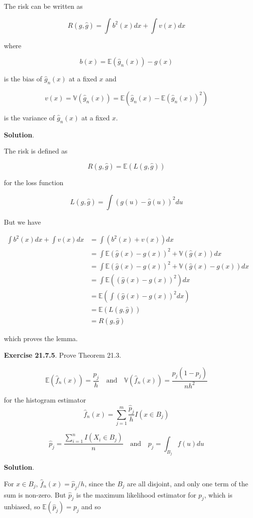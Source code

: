 The risk can be written as

\[ R(g, \hat{g}) = \int b^2(x) dx + \int v(x) dx \]

where

\[ b(x) = \mathbb{E}(\hat{g}_n(x)) - g(x) \]

is the bias of \(\hat{g}_n(x)\) at a fixed \(x\) and

\[ v(x) = \mathbb{V}(\hat{g}_n(x)) = \mathbb{E}\left( \hat{g}_n(x) - \mathbb{E}(\hat{g}_n(x))^2\right) \]

is the variance of \(\hat{g}_n(x)\) at a fixed \(x\).

\textbf{Solution}.

The risk is defined as

\[ R(g, \hat{g}) = \mathbb{E}\left(L(g, \hat{g}) \right) \]

for the loss function

\[ L(g, \hat{g}) = \int (g(u) - \hat{g}(u))^2 du\]

But we have

\[
\begin{align}
\int b^2(x) dx + \int v(x) dx &= \int (b^2(x) + v(x)) dx \\
&= \int \mathbb{E}(\hat{g}(x) - g(x))^2 + \mathbb{V}(\hat{g}(x)) dx \\
&= \int \mathbb{E}(\hat{g}(x) - g(x))^2 + \mathbb{V}(\hat{g}(x) - g(x)) dx \\
&= \int \mathbb{E}((\hat{g}(x) - g(x))^2) dx \\
&= \mathbb{E}\left(\int (\hat{g}(x) - g(x))^2 dx \right) \\
&= \mathbb{E}(L(g, \hat{g})) \\
&=  R(g, \hat{g})
\end{align}
\]

which proves the lemma.

\textbf{Exercise 21.7.5}. Prove Theorem 21.3.

\[ 
\mathbb{E}(\hat{f}_n(x)) = \frac{p_j}{h} 
\quad \text{and} \quad
\mathbb{V}(\hat{f}_n(x)) = \frac{p_j (1 - p_j)}{nh^2}
\]

for the histogram estimator
\[ \hat{f}_n(x) = \sum_{j=1}^m \frac{\hat{p}_j}{h} I(x \in B_j) \]

\[ \hat{p}_j = \frac{\sum_{i=1}^n I(X_i \in B_j)}{n}
\quad \text{and} \quad
p_j = \int_{B_j} f(u) du \]

\textbf{Solution}.

For \(x \in B_j\), \(\hat{f}_n(x) = \hat{p}_j / h\), since the \(B_j\)
are all disjoint, and only one term of the sum is non-zero. But
\(\hat{p}_j\) is the maximum likelihood estimator for \(p_j\), which is
unbiased, so \(\mathbb{E}(\hat{p}_j) = p_j\) and so


